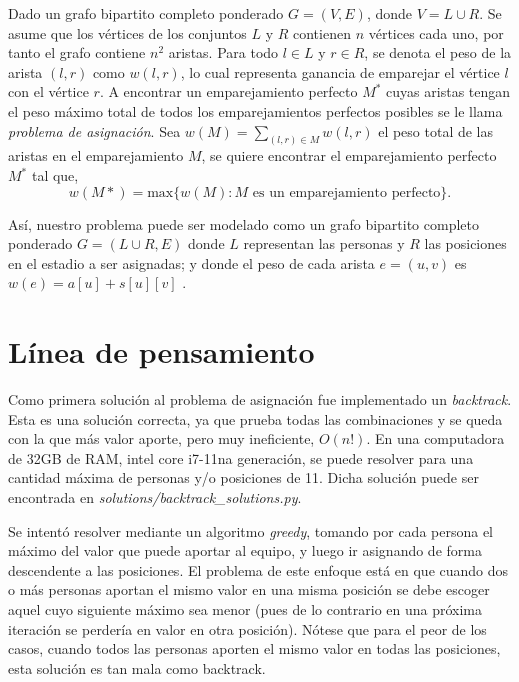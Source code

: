 \documentclass[10pt]{article} %
\begin{document}
	Dado un grafo bipartito completo ponderado $G = (V,E)$, donde $V = L \cup R$. Se asume que los v\'ertices de los conjuntos $L$ y $R$ contienen $n$ v\'ertices cada uno, por tanto el grafo contiene $n^2$ aristas. Para todo $l \in L$ y $r \in R$, se denota el peso de la arista $(l,r)$ como $w(l,r)$, lo cual representa ganancia de emparejar el v\'ertice $l$ con el v\'ertice $r$. A encontrar un emparejamiento perfecto $M^*$ cuyas aristas tengan el peso m\'aximo total de todos los emparejamientos perfectos posibles se le llama \textit{problema de asignaci\'on}. Sea $w(M) = \sum_{(l,r) \in M} w(l,r)$ el peso total de las aristas en el emparejamiento $M$, se quiere encontrar el emparejamiento perfecto $M^*$ tal que,
	\[w(M*)=\text{max}\{w(M):M \text{ es un emparejamiento perfecto}\} .\]
	
	As\'i, nuestro problema puede ser modelado como un grafo bipartito completo ponderado $ G = (L \cup R, E) $ donde $ L $ representan las personas y $ R $ las posiciones en el estadio a ser asignadas; y donde el peso de cada arista $ e = (u, v) $ es $ w(e) = a[u] + s[u][v] $ .
	
	\section{L\'inea de pensamiento}
	
	Como primera soluci\'on al problema de asignaci\'on fue implementado un \textit{backtrack}. Esta es una soluci\'on correcta, ya que prueba todas las combinaciones y se queda con la que m\'as valor aporte, pero muy ineficiente, $ O(n!) $. En una computadora de 32GB de RAM, intel core i7-11na generaci\'on, se puede resolver para una cantidad m\'axima de personas y/o posiciones de 11. Dicha soluci\'on puede ser encontrada en \textit{solutions/backtrack\_solutions.py}.
	
	Se intent\'o resolver mediante un algoritmo \textit{greedy}, tomando por cada persona el m\'aximo del valor que puede aportar al equipo, y luego ir asignando de forma descendente a las posiciones. El problema de este enfoque est\'a en que cuando dos o m\'as personas aportan el mismo valor en una misma posici\'on se debe escoger aquel cuyo siguiente m\'aximo sea menor (pues de lo contrario en una pr\'oxima iteraci\'on se perder\'ia en valor en otra posici\'on). N\'otese que para el peor de los casos, cuando todos las personas aporten el mismo valor en todas las posiciones, esta soluci\'on es tan mala como backtrack.
	
\end{document}
